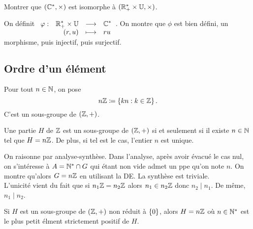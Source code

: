 \documentclass{magnolia}
\begin{document}
\begin{exoUnique}
\exo Montrer que $(\mathbb{C}^*,\times)$ est isomorphe à $(\RPs\times\U,\times)$.
\end{exoUnique}
\begin{sol}
On définit $\dspappli{\phi}{\RPs\times\U}{\Cs}{(r,u)}{ru}$. On montre que $\phi$ est bien défini, un morphisme, puis injectif, puis surjectif.
\end{sol}

\subsection{Ordre d'un élément}

\begin{proposition}
Pour tout $n\in\mathbb{N}$, on pose
\[n\mathbb{Z}\coloneqq\left\{kn : k\in\mathbb{Z}\right\}.\]
C'est un sous-groupe de $(\mathbb{Z},+)$.
\end{proposition}

\begin{proposition}
Une partie $H$ de $\mathbb{Z}$ est un sous-groupe de $(\mathbb{Z},+)$ si et seulement si il
existe $n\in\mathbb{N}$ tel que $H=n\mathbb{Z}$. De plus, si tel est le cas, l'entier $n$ est unique.
\end{proposition}

\begin{preuve}
On raisonne par analyse-synthèse.
Dans l'analyse, après avoir évacué le cas nul, on s'intéresse à $A={\mathbb{N}^*}\cap G$ qui étant non vide admet un ppe qu'on note $n$. On montre qu'alors $G=n\mathbb{Z}$ en utilisant la DE. La synthèse est triviale.\\

L'unicité vient du fait que si $n_1\mathbb{Z}=n_2\mathbb{Z}$ alors $n_1\in n_2\mathbb{Z}$ donc $n_2\mid n_1$. De même, $n_1\mid n_2$.
\end{preuve}

\begin{remarqueUnique}
\remarque Si $H$ est un sous-groupe de $(\mathbb{Z},+)$ non réduit à $\left\{0\right\}$, alors $H=n\mathbb{Z}$
  où $n\in{\mathbb{N}^*}$ est le plus petit élment strictement positif de $H$.
\end{remarqueUnique}
\end{document}
